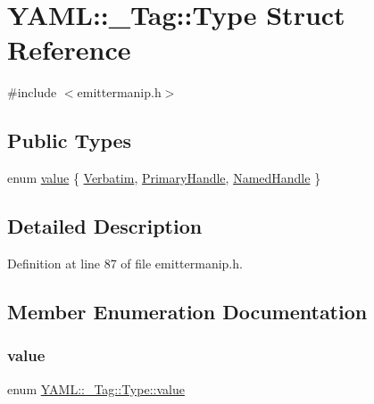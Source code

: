 \hypertarget{struct_y_a_m_l_1_1___tag_1_1_type}{}\section{Y\+A\+ML\+::\+\_\+\+Tag\+::Type Struct Reference}
\label{struct_y_a_m_l_1_1___tag_1_1_type}


{\ttfamily \#include $<$emittermanip.\+h$>$}

\subsection*{Public Types}
\begin{DoxyCompactItemize}
\item 
enum \mbox{\hyperlink{struct_y_a_m_l_1_1___tag_1_1_type_a4bce10ea85e05e6d2424d3575e2bf53d}{value}} \{ \mbox{\hyperlink{struct_y_a_m_l_1_1___tag_1_1_type_a4bce10ea85e05e6d2424d3575e2bf53da23958e801e9eb0aa706512ee6af7f6d2}{Verbatim}}, 
\mbox{\hyperlink{struct_y_a_m_l_1_1___tag_1_1_type_a4bce10ea85e05e6d2424d3575e2bf53da1306d66aca77e81be90eaee42de0edb6}{Primary\+Handle}}, 
\mbox{\hyperlink{struct_y_a_m_l_1_1___tag_1_1_type_a4bce10ea85e05e6d2424d3575e2bf53da4454186ce52b51199e4ac802b956c0e0}{Named\+Handle}}
 \}
\end{DoxyCompactItemize}


\subsection{Detailed Description}


Definition at line 87 of file emittermanip.\+h.



\subsection{Member Enumeration Documentation}
\mbox{\label{struct_y_a_m_l_1_1___tag_1_1_type_a4bce10ea85e05e6d2424d3575e2bf53d}} 
\subsubsection{\texorpdfstring{value}{value}}
{\footnotesize\ttfamily enum \mbox{\hyperlink{struct_y_a_m_l_1_1___tag_1_1_type_a4bce10ea85e05e6d2424d3575e2bf53d}{Y\+A\+M\+L\+::\+\_\+\+Tag\+::\+Type\+::value}}}

